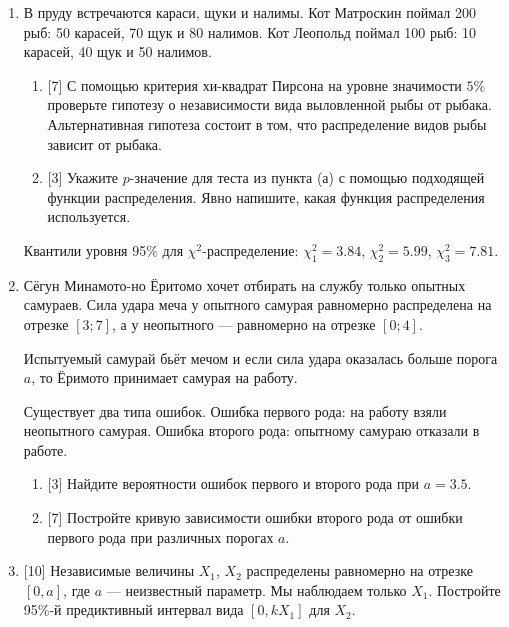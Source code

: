 \documentclass[12pt]{article}
\begin{document}
\begin{enumerate}
    \item В пруду встречаются караси, щуки и налимы. 
    Кот Матроскин поймал 200 рыб: 50 карасей, 70 щук и 80 налимов. 
    Кот Леопольд поймал 100 рыб: 10 карасей, 40 щук и 50 налимов. 

    \begin{enumerate}
        \item {[7]} С помощью критерия хи-квадрат Пирсона на уровне значимости $5\%$ проверьте гипотезу о независимости вида выловленной рыбы от рыбака.
        Альтернативная гипотеза состоит в том, что распределение видов рыбы зависит от рыбака.
        \item {[3]} Укажите $p$-значение для теста из пункта (а) с помощью подходящей функции распределения.
        Явно напишите, какая функция распределения используется. 
    \end{enumerate}

    Квантили уровня 95\% для $\chi^2$-распределение: $\chi^2_1 = 3.84$, $\chi^2_2 = 5.99$, $\chi^2_3 = 7.81$.


    \item Сёгун Минамото-но Ёритомо хочет отбирать на службу только опытных самураев. 
    Сила удара меча у опытного самурая равномерно распределена на отрезке $[3; 7]$,
    а у неопытного — равномерно на отрезке $[0; 4]$.

    Испытуемый самурай бьёт мечом и если сила удара оказалась больше порога $a$, то Ёримото принимает самурая на работу.

    Существует два типа ошибок. 
    Ошибка первого рода: на работу взяли неопытного самурая. 
    Ошибка второго рода: опытному самураю отказали в работе. 

    \begin{enumerate}
        \item {[3]} Найдите вероятности ошибок первого и второго рода при $a = 3.5$.
        \item {[7]} Постройте кривую зависимости ошибки второго рода от ошибки первого рода при различных порогах $a$.
    \end{enumerate}


    
    \item {[10]} Независимые величины $X_1$, $X_2$ распределены равномерно на отрезке $[0, a]$, где $a$ — неизвестный параметр.
    Мы наблюдаем только $X_1$.
    Постройте 95\%-й предиктивный интервал вида $[0, kX_1]$ для $X_2$. 



\end{enumerate}
\end{document}
